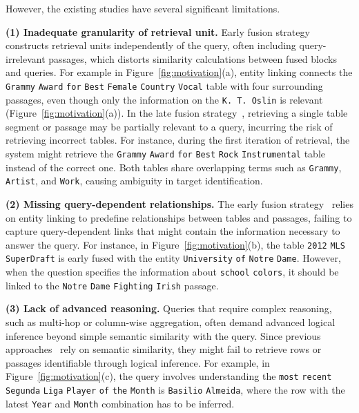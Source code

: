 However, the existing studies have several significant limitations.

\textbf{(1) Inadequate granularity of retrieval unit.} 
Early fusion strategy~\citep{OTT-QA, OTTeR, DoTTeR} constructs retrieval units independently of the query, often including query-irrelevant passages, which distorts similarity calculations between fused blocks and queries.
For example in Figure~\ref{fig:motivation}(a), entity linking connects the \texttt{Grammy} \texttt{Award} \texttt{for} \texttt{Best} \texttt{Female} \texttt{Country} \texttt{Vocal} table with four surrounding passages, even though only the information on the \texttt{K. T. Oslin} is relevant (Figure~\ref{fig:motivation}(a)).
In the late fusion strategy~\citep{CORE, COS}, retrieving a single table segment or passage may be partially relevant to a query, incurring the risk of retrieving incorrect tables.
For instance, during the first iteration of retrieval, the system might retrieve the \texttt{Grammy} \texttt{Award} \texttt{for} \texttt{Best} \texttt{Rock} \texttt{Instrumental} table instead of the correct one. 
Both tables share overlapping terms such as \texttt{Grammy}, \texttt{Artist}, and \texttt{Work}, causing ambiguity in target identification.

\textbf{(2) Missing query-dependent relationships.} The early fusion strategy~\citep{OTT-QA, OTTeR, DoTTeR} relies on entity linking to predefine relationships between tables and passages, failing to capture query-dependent links that might contain the information necessary to answer the query.
For instance, in Figure~\ref{fig:motivation}(b), the table \texttt{2012} \texttt{MLS} \texttt{SuperDraft} is early fused with the entity \texttt{University} \texttt{of} \texttt{Notre} \texttt{Dame}. 
However, when the question specifies the information about \texttt{school} \texttt{colors}, it should be linked to the \texttt{Notre} \texttt{Dame} \texttt{Fighting} \texttt{Irish} passage.

\textbf{(3) Lack of advanced reasoning.} 
Queries that require complex reasoning, such as multi-hop or column-wise aggregation, often demand advanced logical inference beyond simple semantic similarity with the query. 
Since previous approaches~\citep{OTT-QA, OTTeR, DoTTeR, COS, CORE} rely on semantic similarity, they might fail to retrieve rows or passages identifiable through logical inference.
For example, in Figure~\ref{fig:motivation}(c), the query involves understanding the \texttt{most} \texttt{recent} \texttt{Segunda} \texttt{Liga} \texttt{Player} \texttt{of} \texttt{the} \texttt{Month} is \texttt{Basilio} \texttt{Almeida}, where the row with the latest \texttt{Year} and \texttt{Month} combination has to be inferred. 

